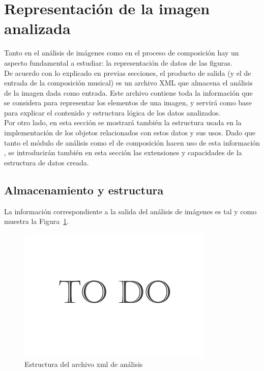 \section{Representación de la imagen analizada}

Tanto en el análisis de imágenes como en el proceso de composición hay un aspecto fundamental a estudiar: la representación de datos de las figuras.\\

De acuerdo con lo explicado en previas secciones, el producto de salida  (y el de entrada de la composición musical) es un archivo XML que almacena el análisis de la imagen dada como entrada. Este archivo contiene toda la información que se considera para representar los elementos de una imagen, y servirá como base para explicar el contenido y estructura lógica de los datos analizados.\\

Por otro lado, en esta sección se mostrará también la estructura usada en la implementación de los objetos relacionados con estos datos y sus usos. Dado que tanto el módulo de análisis como el de composición hacen uso de esta información , se introducirán también en esta sección las extensiones y capacidades de la estructura de datos creada.

\subsection{Almacenamiento y estructura}
\label{subsec:xmlstruct}

	La información correspondiente a la salida del análisis de imágenes es tal y como muestra la Figura~\ref{fig:estructuraFiguras}.\\

			\begin{figure}[htbp]
			\centering
			\includegraphics[scale=0.47]{graphics/todo.png}
			\caption{Estructura del archivo xml de análisis}
			\label{fig:estructuraFiguras}
			\end{figure}
		
